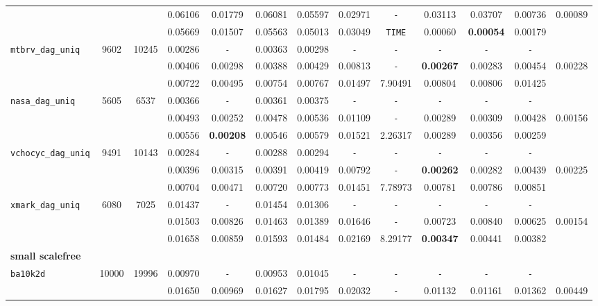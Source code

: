 \begin{table}
{\begin{tabular}{ l c c | c c c c c c c c c || c }
 &  &  & 0.06106 & 0.01779 & 0.06081 & 0.05597 & 0.02971 & \verb|-| & 0.03113 & 0.03707 & 0.00736 & 0.00089 \\
 &  &  & 0.05669 & 0.01507 & 0.05563 & 0.05013 & 0.03049 & \verb|TIME| & 0.00060 & \textbf{0.00054} & 0.00179 & \\
\hline
\verb|mtbrv_dag_uniq| & 9602 & 10245 & 0.00286 & \verb|-| & 0.00363 & 0.00298 & \verb|-| & \verb|-| & \verb|-| & \verb|-| & \verb|-| & \\
 &  &  & 0.00406 & 0.00298 & 0.00388 & 0.00429 & 0.00813 & \verb|-| & \textbf{0.00267} & 0.00283 & 0.00454 & 0.00228 \\
 &  &  & 0.00722 & 0.00495 & 0.00754 & 0.00767 & 0.01497 & 7.90491 & 0.00804 & 0.00806 & 0.01425 & \\
\hline
\verb|nasa_dag_uniq| & 5605 & 6537 & 0.00366 & \verb|-| & 0.00361 & 0.00375 & \verb|-| & \verb|-| & \verb|-| & \verb|-| & \verb|-| & \\
 &  &  & 0.00493 & 0.00252 & 0.00478 & 0.00536 & 0.01109 & \verb|-| & 0.00289 & 0.00309 & 0.00428 & 0.00156 \\
 &  &  & 0.00556 & \textbf{0.00208} & 0.00546 & 0.00579 & 0.01521 & 2.26317 & 0.00289 & 0.00356 & 0.00259 & \\
\hline
\verb|vchocyc_dag_uniq| & 9491 & 10143 & 0.00284 & \verb|-| & 0.00288 & 0.00294 & \verb|-| & \verb|-| & \verb|-| & \verb|-| & \verb|-| & \\
 &  &  & 0.00396 & 0.00315 & 0.00391 & 0.00419 & 0.00792 & \verb|-| & \textbf{0.00262} & 0.00282 & 0.00439 & 0.00225 \\
 &  &  & 0.00704 & 0.00471 & 0.00720 & 0.00773 & 0.01451 & 7.78973 & 0.00781 & 0.00786 & 0.00851 & \\
\hline
\verb|xmark_dag_uniq| & 6080 & 7025 & 0.01437 & \verb|-| & 0.01454 & 0.01306 & \verb|-| & \verb|-| & \verb|-| & \verb|-| & \verb|-| & \\
 &  &  & 0.01503 & 0.00826 & 0.01463 & 0.01389 & 0.01646 & \verb|-| & 0.00723 & 0.00840 & 0.00625 & 0.00154 \\
 &  &  & 0.01658 & 0.00859 & 0.01593 & 0.01484 & 0.02169 & 8.29177 & \textbf{0.00347} & 0.00441 & 0.00382 & \\
\hline
\multicolumn{13}{l}{\textbf{small scalefree}} \\
\hline
\verb|ba10k2d| & 10000 & 19996 & 0.00970 & \verb|-| & 0.00953 & 0.01045 & \verb|-| & \verb|-| & \verb|-| & \verb|-| & \verb|-| & \\
 &  &  & 0.01650 & 0.00969 & 0.01627 & 0.01795 & 0.02032 & \verb|-| & 0.01132 & 0.01161 & 0.01362 & 0.00449 \\

\end{tabular}}
\end{table}
